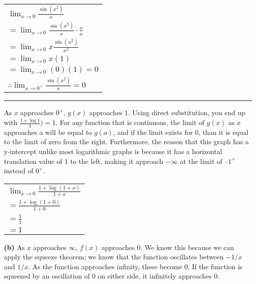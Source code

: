 \documentclass[answers,addpoints]{exam}
\begin{document}
\begin{questions}
\begin{solution}
\begin{center}
\begin{tabular}{@{}l@{}}
$\displaystyle \lim_{x \to 0} \frac{\sin(x^2)}{x}$ \\[6pt]
$\displaystyle = \lim_{x \to 0} \frac{\sin(x^2)}{x} \cdot \frac{x}{x}$ \\[6pt]
$\displaystyle = \lim_{x \to 0} x\frac{\sin(x^2)}{x^2}$ \\[6pt]
$\displaystyle = \lim_{x \to 0} x(1)$ \\[6pt]
$\displaystyle = \lim_{x \to 0} (0)(1)=0$ \\[6pt]
$\displaystyle \therefore \lim_{x \to 0^+} \frac{\sin(x^2)}{x}=0$ \\[6pt]
\end{tabular}
\end{center}

\hrule
As $x$ approaches $0^+$, $g(x)$ approaches $1$. Using direct substitution, you end up with $\frac{1+\log{1}}{1})=1$. For any function that is continuous, the limit of $g(x)$ as $x$ approaches a will be equal to $g(a)$, and if the limit exists for $0$, than it is equal to the limit of zero from the right. Furthermore, the reason that this graph has a y-intercept unlike most logarithmic graphs is because it has a horizontal translation value of $1$ to the left, making it approach $-\infty$ at the limit of $–1^+$ instead of $0^+$.

\begin{center}
\begin{tabular}{@{}l@{}}
$\displaystyle \lim_{x \to 0} \frac{1+\log(1+x)}{1+x}$ \\[6pt]
$\displaystyle = \frac{1+\log(1+0)}{1+0}$ \\[6pt]
$\displaystyle = \frac{1}{1}$ \\[6pt]
$\displaystyle = 1$ \\[6pt]
\end{tabular}
\end{center}

\textbf{(b)}
As $x$ approaches $\infty$, $f(x)$ approaches 0. We know this because we can apply the squeeze theorem; we know that the function oscillates between $-1/x$ and $1/x$. As the function approaches infinity, these become $0$. If the function is squeezed by an oscillation of $0$ on either side, it infinitely approaches $0$.


\end{solution}
\end{questions}
\end{document}
